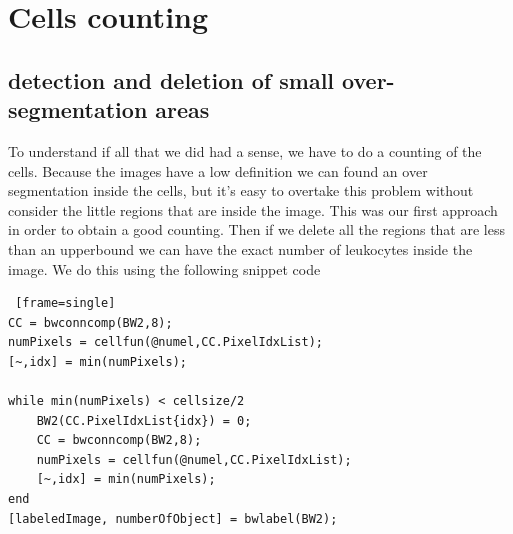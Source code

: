 \section{Cells counting}
\subsection{detection and deletion of small over-segmentation areas}
To understand if all that we did had a sense, we have to do a counting of the cells. Because the images have a low definition we can found an over segmentation inside the cells, but it's easy to overtake this problem without consider the little regions that are inside the image. This was our first approach in order to obtain a good counting. Then if we delete all the regions that are less than an upperbound we can have the exact number of leukocytes inside the image. We do this using the following snippet code
\bigskip
\begin{minipage}{\linewidth}
\begin{lstlisting} [frame=single]
CC = bwconncomp(BW2,8);
numPixels = cellfun(@numel,CC.PixelIdxList);
[~,idx] = min(numPixels);

while min(numPixels) < cellsize/2
    BW2(CC.PixelIdxList{idx}) = 0;
    CC = bwconncomp(BW2,8);
    numPixels = cellfun(@numel,CC.PixelIdxList);
    [~,idx] = min(numPixels);
end
[labeledImage, numberOfObject] = bwlabel(BW2);
\end{lstlisting}
\end{minipage}
\bigskip

